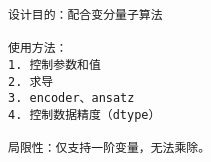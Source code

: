 \begin{lstlisting}
设计目的：配合变分量子算法

使用方法：
1. 控制参数和值
2. 求导
3. encoder、ansatz
4. 控制数据精度（dtype）

局限性：仅支持一阶变量，无法乘除。
\end{lstlisting}